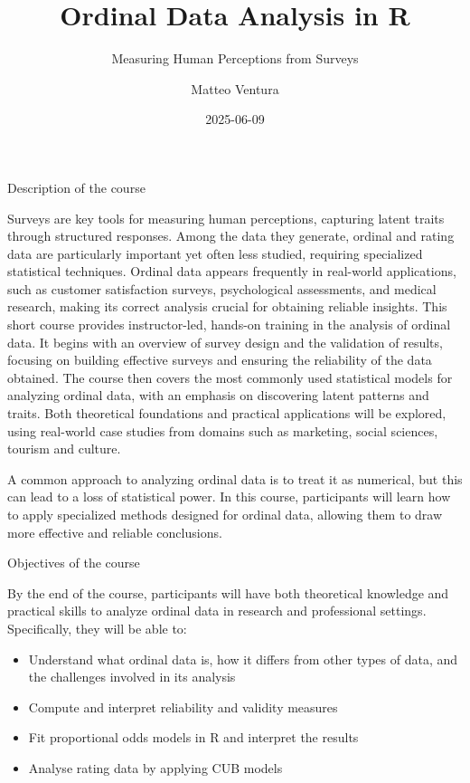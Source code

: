 \documentclass[
  letterpaper,
  DIV=11,
  numbers=noendperiod]{scrartcl}
\title{Ordinal Data Analysis in R}
\subtitle{Measuring Human Perceptions from Surveys}
\author{Matteo Ventura}
\date{2025-06-09}
\providecommand{\tightlist}{%
  \setlength{\itemsep}{0pt}\setlength{\parskip}{0pt}}\usepackage{longtable,booktabs,array}
\begin{document}
\maketitle
\ifdefined\Shaded\renewenvironment{Shaded}{\begin{tcolorbox}[breakable, borderline west={3pt}{0pt}{shadecolor}, sharp corners, frame hidden, interior hidden, boxrule=0pt, enhanced]}{\end{tcolorbox}}\fi

Description of the course

Surveys are key tools for measuring human perceptions, capturing latent
traits through structured responses. Among the data they generate,
ordinal and rating data are particularly important yet often less
studied, requiring specialized statistical techniques. Ordinal data
appears frequently in real-world applications, such as customer
satisfaction surveys, psychological assessments, and medical research,
making its correct analysis crucial for obtaining reliable insights.
This short course provides instructor-led, hands-on training in the
analysis of ordinal data. It begins with an overview of survey design
and the validation of results, focusing on building effective surveys
and ensuring the reliability of the data obtained. The course then
covers the most commonly used statistical models for analyzing ordinal
data, with an emphasis on discovering latent patterns and traits. Both
theoretical foundations and practical applications will be explored,
using real-world case studies from domains such as marketing, social
sciences, tourism and culture.

A common approach to analyzing ordinal data is to treat it as numerical,
but this can lead to a loss of statistical power. In this course,
participants will learn how to apply specialized methods designed for
ordinal data, allowing them to draw more effective and reliable
conclusions.

Objectives of the course

By the end of the course, participants will have both theoretical
knowledge and practical skills to analyze ordinal data in research and
professional settings. Specifically, they will be able to:

\begin{itemize}
\tightlist
\item
  Understand what ordinal data is, how it differs from other types of
  data, and the challenges involved in its analysis
\item
  Compute and interpret reliability and validity measures
\item
  Fit proportional odds models in R and interpret the results
\item
  Analyse rating data by applying CUB models
\end{itemize}
\end{document}
